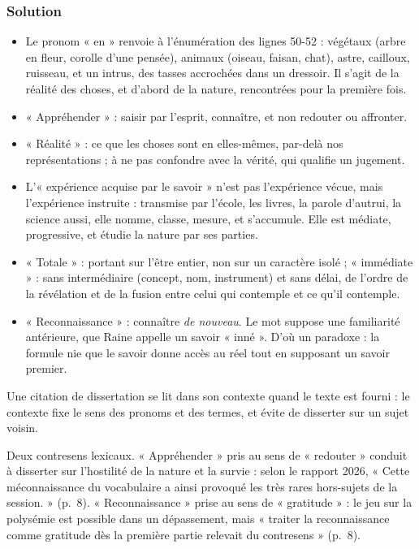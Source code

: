 \documentclass[11pt,a4paper]{article}
\providecommand{\tightlist}{\setlength{\itemsep}{0pt}\setlength{\parskip}{0pt}}
\begin{document}
\hypertarget{solution-3}{%
\subsubsection{Solution}\label{solution-3}}

\begin{itemize}
\tightlist
\item
  Le pronom « en » renvoie à l'énumération des lignes 50-52 : végétaux (arbre en fleur, corolle d'une pensée), animaux (oiseau, faisan, chat), astre, cailloux, ruisseau, et un intrus, des tasses accrochées dans un dressoir. Il s'agit de la réalité des choses, et d'abord de la nature, rencontrées pour la première fois.
\item
  « Appréhender » : saisir par l'esprit, connaître, et non redouter ou affronter.
\item
  « Réalité » : ce que les choses sont en elles-mêmes, par-delà nos représentations ; à ne pas confondre avec la vérité, qui qualifie un jugement.
\item
  L'« expérience acquise par le savoir » n'est pas l'expérience vécue, mais l'expérience instruite : transmise par l'école, les livres, la parole d'autrui, la science aussi, elle nomme, classe, mesure, et s'accumule. Elle est médiate, progressive, et étudie la nature par ses parties.
\item
  « Totale » : portant sur l'être entier, non sur un caractère isolé ; « immédiate » : sans intermédiaire (concept, nom, instrument) et sans délai, de l'ordre de la révélation et de la fusion entre celui qui contemple et ce qu'il contemple.
\item
  « Reconnaissance » : connaître \emph{de nouveau}. Le mot suppose une familiarité antérieure, que Raine appelle un savoir « inné ». D'où un paradoxe : la formule nie que le savoir donne accès au réel tout en supposant un savoir premier.
\end{itemize}

\begin{methode}

Une citation de dissertation se lit dans son contexte quand le texte est fourni : le contexte fixe le sens des pronoms et des termes, et évite de disserter sur un sujet voisin.

\end{methode}

\begin{piege}

Deux contresens lexicaux. « Appréhender » pris au sens de « redouter » conduit à disserter sur l'hostilité de la nature et la survie : selon le rapport 2026, « Cette méconnaissance du vocabulaire a ainsi provoqué les très rares hors-sujets de la session. » (p.~8). « Reconnaissance » prise au sens de « gratitude » : le jeu sur la polysémie est possible dans un dépassement, mais « traiter la reconnaissance comme gratitude dès la première partie relevait du contresens » (p.~8).

\end{piege}
\end{document}
